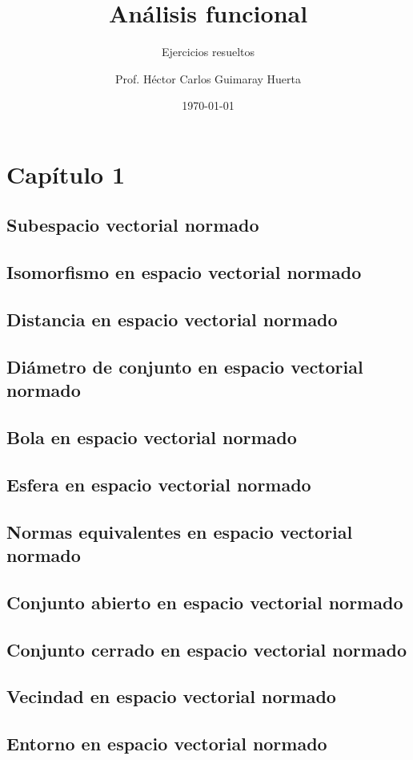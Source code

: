 \documentclass[a4paper]{scrbook}
\title{Análisis funcional}
\subtitle{Ejercicios resueltos}
\author{Prof. Héctor Carlos Guimaray Huerta}
\date{\today}
\theoremstyle{definition}
\begin{document}
\maketitle
\tableofcontents

\chapter{Capítulo 1}


\section{Subespacio vectorial normado}
\section{Isomorfismo en espacio vectorial normado}
\section{Distancia en espacio vectorial normado}
\section{Diámetro de conjunto en espacio vectorial normado}
\section{Bola en espacio vectorial normado}
\section{Esfera en espacio vectorial normado}
\section{Normas equivalentes en espacio vectorial normado}
\section{Conjunto abierto en espacio vectorial normado}
\section{Conjunto cerrado en espacio vectorial normado}
\section{Vecindad en espacio vectorial normado}
\section{Entorno en espacio vectorial normado}
\end{document}
